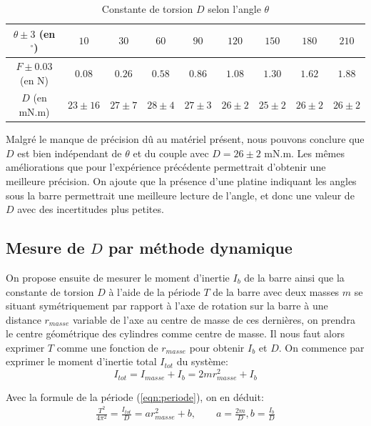 \documentclass[12pt]{article}
\begin{document}
\break

\begin{table}[h!]
	\centering
	\begin{tabular}{||c | c c c c c c c c||} 
		\hline
		$\theta \pm 3$ (en $^\circ$) & $10$ & $30$ & $60$ & $90$ & $120$ & $150$ & $180$ & $210$ \\
		\hline
        $F \pm 0.03$ (en N) & $0.08$ & $0.26$ & $0.58$ & $0.86$ & $1.08$ & $1.30$ & $1.62$ & $1.88$\\
		\hline
        $D$ (en mN.m) & $23 \pm 16$ & $27 \pm 7$ & $28 \pm 4$ & $27 \pm 3$ & $26 \pm 2$ & $25 \pm 2$ & $26 \pm 2$ & $26 \pm 2$\\
        \hline
    \end{tabular}
	\caption{Constante de torsion $D$ selon l'angle $\theta$}
	\label{table:mesure_D_statique}
\end{table}

Malgré le manque de précision dû au matériel présent, nous pouvons conclure que $D$ est bien indépendant de $\theta$ et du couple avec $D=26 \pm 2 \text{ mN.m}$. 
Les mêmes améliorations que pour l'expérience précédente permettrait d'obtenir une meilleure précision. 
On ajoute que la présence d'une platine indiquant les angles sous la barre permettrait une meilleure
lecture de l'angle, et donc une valeur de $D$ avec des incertitudes plus petites.


\subsection{Mesure de $D$ par méthode dynamique}
On propose ensuite de mesurer le moment d'inertie $I_b$ de la barre ainsi que la constante de torsion $D$ à l'aide de la période $T$
de la barre avec deux masses $m$ se situant symétriquement par rapport à l'axe de rotation sur la barre à une distance $r_{masse}$ variable de l'axe au centre de masse de ces dernières, on prendra le centre géométrique des cylindres
comme centre de masse. Il nous faut alors exprimer $T$ comme une fonction de $r_{masse}$ pour obtenir 
$I_b$ et $D$. On commence par exprimer le moment d'inertie total $I_{tot}$ du système:
\begin{equation}
    I_{tot} = I_{masse} + I_b = 2mr_{masse}^2 + I_b
\end{equation}

Avec la formule de la période (\ref{eqn:periode}), on en déduit:
\begin{align*}
    \frac{T^2}{4\pi^2} = \frac{I_{tot}}{D} = ar_{masse}^2 + b, \quad \quad a = \frac{2m}{D}, b=\frac{I_b}{D}
\end{align*}
\end{document}
